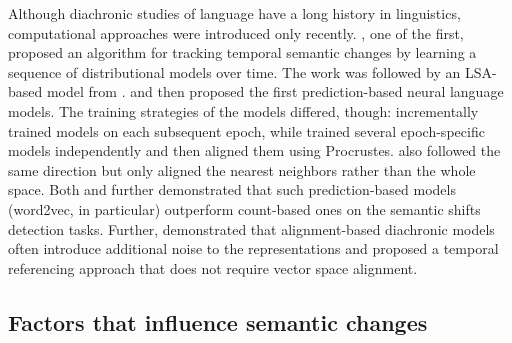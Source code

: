 \documentclass[output=paper]{langsci/langscibook}
\begin{document}
Although diachronic studies of language have a long history in linguistics, computational approaches were introduced only recently. \citet{jurgens2009event}, one of the first, proposed an algorithm for tracking temporal semantic changes by learning a sequence of distributional models over time. The work was followed by an LSA-based model from \citet{sagi-etal-2009-semantic}. \citet{kim-etal-2014-temporal} and \citet{hamilton-etal-2016-diachronic} then proposed the first prediction-based neural language models. The training strategies of the models differed, though: \citet{kim-etal-2014-temporal} incrementally trained models on each subsequent epoch, while \citet{hamilton-etal-2016-diachronic} trained several epoch-specific models independently and then aligned them using Procrustes. \citet{kulkarni2015statistically} also followed the same direction but only aligned the nearest neighbors rather than the whole space.  Both \citet{kulkarni2015statistically} and \citet{hamilton-etal-2016-diachronic} further demonstrated that such prediction-based models (word2vec, in particular) outperform count-based ones on the semantic shifts detection tasks. Further, \citet{dubossarsky-etal-2019-time} demonstrated that alignment-based diachronic models often introduce additional noise to the representations and proposed a temporal referencing approach that does not require vector space alignment. 


\subsection{Factors that influence semantic changes}
\end{document}

